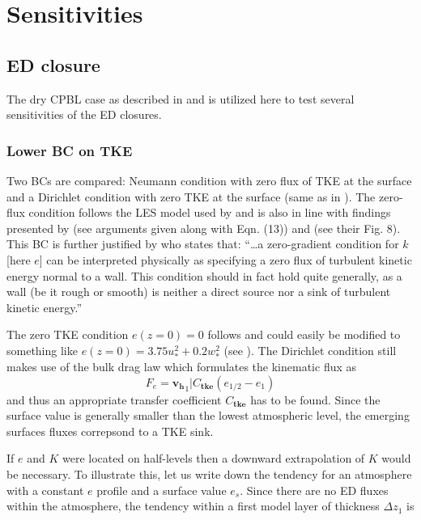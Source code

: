 \documentclass[dvipdfmx,a4paper,10pt]{article}
\begin{document}
\section{Sensitivities}
\subsection{ED closure}

The dry CPBL case as described in \cite{nieuwstadt93} and \cite{witek11} is utilized here to test several sensitivities of the ED closures. 

\subsubsection{Lower BC on TKE}

Two BCs are compared: Neumann condition with zero flux of TKE at the surface and a Dirichlet condition with zero TKE at the surface (same as in \cite{teixeira04}). The zero-flux condition follows the LES model used by \cite{deardorff74} and is also in line with findings presented by \cite{mcbean75} (see arguments given along with Eqn. (13)) and \cite{lenschow74} (see their Fig. 8). This BC is further justified by \cite{fuhrmann10} who states that:  ``\dots a zero-gradient condition for $k$ [here $e$] can be interpreted physically as specifying a zero flux of turbulent kinetic energy normal to a wall. This condition should in fact hold quite generally, as a wall (be it rough or smooth) is neither a direct source nor a sink of turbulent kinetic energy.''

The zero TKE condition $e(z=0)=0$ follows \cite{teixeira04} and could easily be modified to something like  $e(z=0)=3.75 u_*^2+0.2w_*^2$ (see \cite{witek11}). The Dirichlet condition still makes use of the bulk drag law which formulates the kinematic flux as 
\begin{equation}
 F_e=\mathbf{v_h}_1| C_{\mathbf{tke}} (e_{1/2}-e_1)
\end{equation}
and thus an appropriate transfer coefficient $C_{\mathbf{tke}}$ has to be found. Since the surface value is generally smaller than the lowest atmospheric level, the emerging surfaces fluxes correpsond to a TKE sink. 

If $e$ and $K$ were located on half-levels then a downward extrapolation of $K$ would be necessary. To illustrate this, let us write down the tendency for an atmosphere with a constant $e$ profile and a surface value $e_s$. Since there are no ED fluxes within the atmosphere, the tendency within a first model layer of thickness $\Delta z_1$ is 
\end{document}
